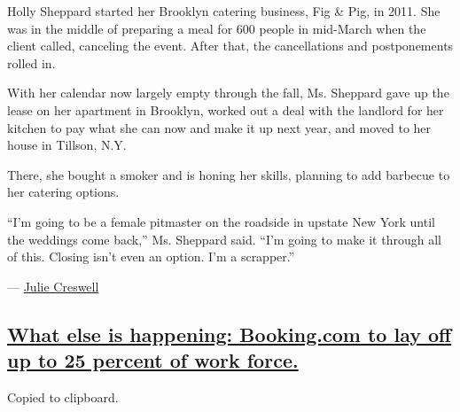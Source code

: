 Holly Sheppard started her Brooklyn catering business, Fig \& Pig, in
2011. She was in the middle of preparing a meal for 600 people in
mid-March when the client called, canceling the event. After that, the
cancellations and postponements rolled in.

With her calendar now largely empty through the fall, Ms. Sheppard gave
up the lease on her apartment in Brooklyn, worked out a deal with the
landlord for her kitchen to pay what she can now and make it up next
year, and moved to her house in Tillson, N.Y.

There, she bought a smoker and is honing her skills, planning to add
barbecue to her catering options.

``I'm going to be a female pitmaster on the roadside in upstate New York
until the weddings come back,'' Ms. Sheppard said. ``I'm going to make
it through all of this. Closing isn't even an option. I'm a scrapper.''

--- \href{https://www.nytimes.com/by/julie-creswell}{Julie Creswell}

\hypertarget{what-else-is-happening-bookingcom-to-lay-off-up-to-25-percent-of-work-force}{%
\subsection{\texorpdfstring{\protect\hyperlink{what-else-is-happening-bookingcom-to-lay-off-up-to-25-percent-of-work-force}{What
else is happening: Booking.com to lay off up to 25 percent of work
force.}}{What else is happening: Booking.com to lay off up to 25 percent of work force.}}\label{what-else-is-happening-bookingcom-to-lay-off-up-to-25-percent-of-work-force}}

Copied to clipboard.

